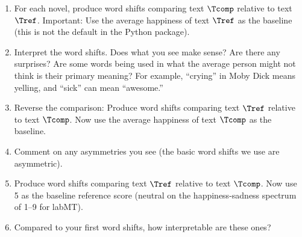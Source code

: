 \begin{enumerate}
  \begin{enumerate} 
  \item 
    For each novel,
    produce word shifts comparing text $\Tcomp$ relative to text $\Tref$.
    Important: Use the average happiness of text $\Tref$ as the baseline (this is not the default in the Python package).
  \item 
    Interpret the word shifts. Does what you see make sense?
    Are there any surprises?
    Are some words being used in what the average person might not think is their primary meaning?
    For example, ``crying'' in Moby Dick means yelling, and ``sick'' can mean ``awesome.''
  \item
    Reverse the comparison:
    Produce word shifts comparing text $\Tref$ relative to text $\Tcomp$.
    Now use the average happiness of text $\Tcomp$ as the baseline.
  \item
    Comment on any asymmetries you see (the basic word shifts we use are asymmetric).
  \item
    Produce word shifts comparing text $\Tref$ relative to text $\Tcomp$.
    Now use 5 as the baseline reference score (neutral on the happiness-sadness spectrum of 1--9 for labMT).
  \item
    Compared to your first word shifts, how interpretable are these ones?
  \end{enumerate}

  
   \solutionstart


   \solutionend

\end{enumerate}

